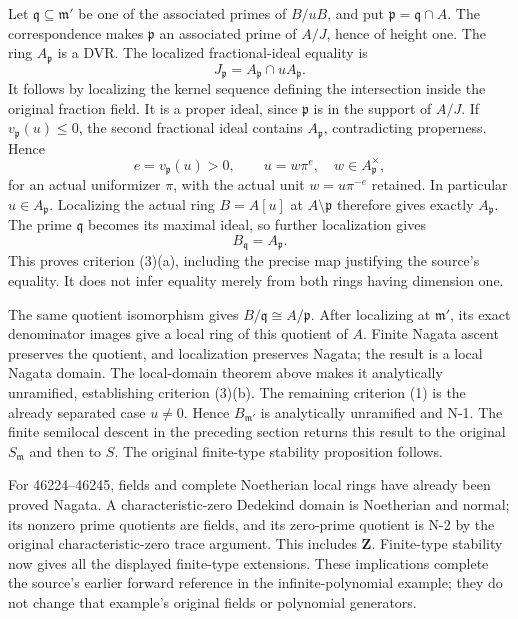 Let \(\mathfrak q\subseteq\mathfrak m'\) be one of the associated primes of \(B/uB\), and put \(\mathfrak p=\mathfrak q\cap A\). The correspondence makes \(\mathfrak p\) an associated prime of \(A/J\), hence of height one. The ring \(A_{\mathfrak p}\) is a DVR. The localized fractional-ideal equality is \[
 J_{\mathfrak p}=A_{\mathfrak p}\cap uA_{\mathfrak p}.
\] It follows by localizing the kernel sequence defining the intersection inside the original fraction field. It is a proper ideal, since \(\mathfrak p\) is in the support of \(A/J\). If \(v_{\mathfrak p}(u)\leq0\), the second fractional ideal contains \(A_{\mathfrak p}\), contradicting properness. Hence \[
 e=v_{\mathfrak p}(u)>0,\qquad u=w\pi^e,
 \quad w\in A_{\mathfrak p}^{\times},
\] for an actual uniformizer \(\pi\), with the actual unit \(w=u\pi^{-e}\) retained. In particular \(u\in A_{\mathfrak p}\). Localizing the actual ring \(B=A[u]\) at \(A\setminus\mathfrak p\) therefore gives exactly \(A_{\mathfrak p}\). The prime \(\mathfrak q\) becomes its maximal ideal, so further localization gives \[
 B_{\mathfrak q}=A_{\mathfrak p}.
\] This proves criterion (3)(a), including the precise map justifying the source's equality. It does not infer equality merely from both rings having dimension one.

The same quotient isomorphism gives \(B/\mathfrak q\cong A/\mathfrak p\). After localizing at \(\mathfrak m'\), its exact denominator images give a local ring of this quotient of \(A\). Finite Nagata ascent preserves the quotient, and localization preserves Nagata; the result is a local Nagata domain. The local-domain theorem above makes it analytically unramified, establishing criterion (3)(b). The remaining criterion (1) is the already separated case \(u\ne0\). Hence \(B_{\mathfrak m'}\) is analytically unramified and N-1. The finite semilocal descent in the preceding section returns this result to the original \(S_{\mathfrak m}\) and then to \(S\). The original finite-type stability proposition follows.

For 46224--46245, fields and complete Noetherian local rings have already been proved Nagata. A characteristic-zero Dedekind domain is Noetherian and normal; its nonzero prime quotients are fields, and its zero-prime quotient is N-2 by the original characteristic-zero trace argument. This includes \(\mathbf Z\). Finite-type stability now gives all the displayed finite-type extensions. These implications complete the source's earlier forward reference in the infinite-polynomial example; they do not change that example's original fields or polynomial generators.

